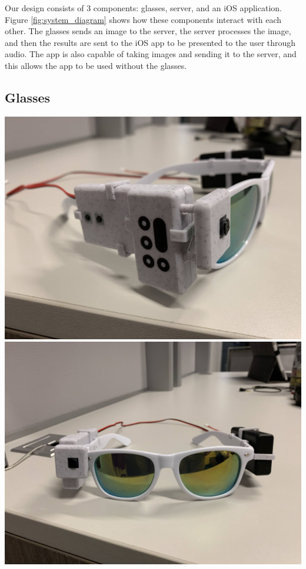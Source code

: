 \documentclass[a4paper,11pt]{article}
\begin{document}
Our design consists of 3 components: glasses, server, and an iOS application. Figure \ref{fig:system_diagram} shows how these components interact with each other. The glasses sends an image to the server, the server processes the image, and then the results are sent to the iOS app to be presented to the user through audio. The app is also capable of taking images and sending it to the server, and this allows the app to be used without the glasses.

\newpage
\subsection{Glasses}
\begin{center}
    \includegraphics[width={0.3\linewidth}]{img/glasses/left.jpg}
    \includegraphics[width={0.3\linewidth}]{img/glasses/middle.jpg}

\end{center}
\end{document}
